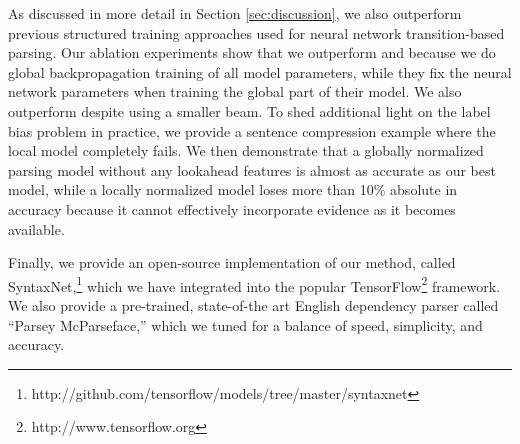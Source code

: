 As discussed in more detail in Section \ref{sec:discussion},
we also outperform previous structured training
approaches used for neural network transition-based parsing.
Our ablation experiments show that
we outperform  and 
because we do global backpropagation training of all model parameters, while
they fix the neural network parameters when training the global part of their model.
We also outperform  despite using a smaller beam.
To shed additional light on the label bias problem in practice,
we provide a sentence compression example where the local model completely fails.
We then demonstrate that a globally normalized parsing model without any lookahead
features is almost as accurate as our best model,
while a locally normalized model loses more than 10\% absolute in accuracy
because it cannot effectively incorporate evidence as it becomes available.

Finally, we provide an open-source implementation of our method, called
SyntaxNet,\footnote{http://github.com/tensorflow/models/tree/master/syntaxnet}
which we have integrated into the popular TensorFlow\footnote{http://www.tensorflow.org} 
framework. We also provide a pre-trained,
state-of-the art English dependency parser called ``Parsey McParseface,'' which
we tuned for a balance of speed, simplicity, and accuracy.

